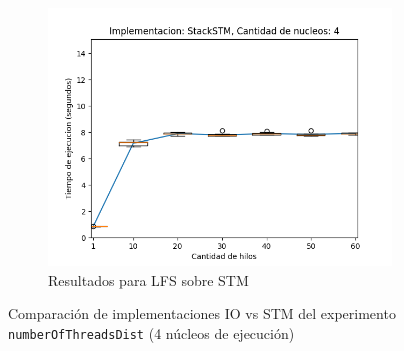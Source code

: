 \begin{appendices}
\begin{figure}[H]
\begin{subfigure}[b]{0.49\textwidth}
        \includegraphics[width=\textwidth]{images/numberOfThreadsDist/plots/expStackSTM-4}
        \caption{Resultados para LFS sobre STM}
        \label{subfig:numberOfThreadsDist-stackstm-4}
    \end{subfigure}
    \caption{Comparación de implementaciones IO vs STM del experimento \texttt{numberOfThreadsDist} (4 núcleos de ejecución)}
    \label{fig:numberOfThreadsDist-boxplots-4}
\end{figure}

\end{appendices}